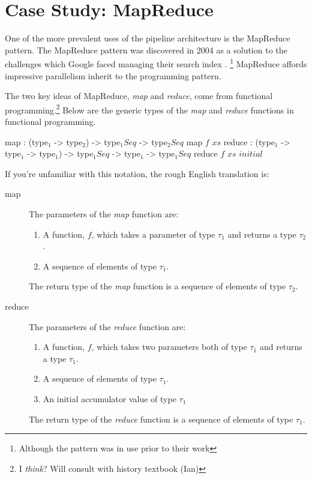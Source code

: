 \section{Case Study: MapReduce}

One of the more prevalent uses of the pipeline architecture is the MapReduce pattern.
The MapReduce pattern was discovered in 2004 as a solution to the challenges which Google faced managing their search index \cite{mapreduce}.%
\footnote{Although the pattern was in use prior to their work\cite{mapreduce-critique}}%
MapReduce affords impressive parallelism inherit to the programming pattern.

The two key ideas of MapReduce, \textsl{map} and \textsl{reduce}, come from functional programming.\footnote{I \textsl{think}? Will consult with history textbook (Ian)}
Below are the generic types of the \textsl{map} and \textsl{reduce} functions in functional programming.

\begin{code}[language=lambda]{}
map : (type$_1$ -> type$_2$) -> type$_1 Seq$ -> type$_2 Seq$
map $f$ $xs$
reduce : (type$_1$ -> type$_1$ -> type$_1$) -> type$_1 Seq$ -> type$_1$ -> type$_1 Seq$
reduce $f$ $xs$ $initial$
\end{code}

If you're unfamiliar with this notation, the rough English translation is:
\begin{description}
    \item[map] The parameters of the \textsl{map} function are:
        \begin{enumerate}[label=(\alph*)]
            \item A function, $f$, which takes a parameter of type $\tau_1$ and returns a type $\tau_2$.
            \item A sequence of elements of type $\tau_1$.
        \end{enumerate}
        The return type of the \textsl{map} function is a sequence of elements of type $\tau_2$.
    \item[reduce] The parameters of the \textsl{reduce} function are:
        \begin{enumerate}[label=(\alph*)]
            \item A function, $f$, which takes two parameters both of type $\tau_1$ and returns a type $\tau_1$.
            \item A sequence of elements of type $\tau_1$.
            \item An initial accumulator value of type $\tau_1$
        \end{enumerate}
        The return type of the \textsl{reduce} function is a sequence of elements of type $\tau_1$.
\end{description}

